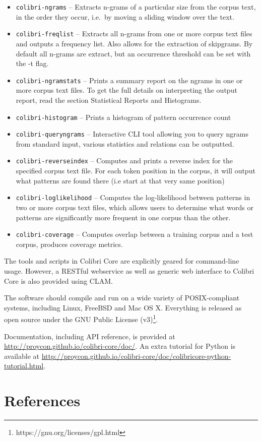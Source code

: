\documentclass[review]{elsarticle}
\begin{document}
\begin{itemize}
    \item \texttt{colibri-ngrams} -- Extracts n-grams of a particular size from the
        corpus text, in the order they occur, i.e.\ by moving a sliding window over the text.
    \item \texttt{colibri-freqlist} -- Extracts all n-grams from one or more corpus text files and outputs a frequency list. Also allows for the extraction of skipgrams. By default all n-grams are extract, but an occurrence threshold can be set with the -t flag.
    \item \texttt{colibri-ngramstats} -- Prints a summary report on the ngrams in one or more corpus text files. To get the full details on interpreting the output report, read the section Statistical Reports and Histograms.
    \item \texttt{colibri-histogram} -- Prints a histogram of pattern occurrence count
    \item \texttt{colibri-queryngrams} -- Interactive CLI tool allowing you to query ngrams from standard input, various statistics and relations can be outputted.
    \item \texttt{colibri-reverseindex} -- Computes and prints a reverse index for the specified corpus text file. For each token position in the corpus, it will output what patterns are found there (i.e start at that very same position)
    \item \texttt{colibri-loglikelihood} -- Computes the log-likelihood between patterns in two or more corpus text files, which allows users to determine what words or patterns are significantly more frequent in one corpus than the other.
    \item \texttt{colibri-coverage} -- Computes overlap between a training corpus and a test corpus, produces coverage metrics.
\end{itemize}

The tools and scripts in Colibri Core are explicitly geared for command-line
usage. However, a RESTful webservice as well as generic web interface to
Colibri Core is also provided using CLAM\cite{CLAMPAPER}.

The software should compile and run on a wide variety of POSIX-compliant
systems, including Linux, FreeBSD and Mac OS X. Everything is released as open
source under the GNU Public License (v3)\footnote{https://gnu.org/licenses/gpl.html}.

Documentation, including API reference, is provided at
\url{http://proycon.github.io/colibri-core/doc/}. An extra tutorial for Python
is available at \url{http://proycon.github.io/colibri-core/doc/colibricore-python-tutorial.html}.

\section*{References}



\end{document}
